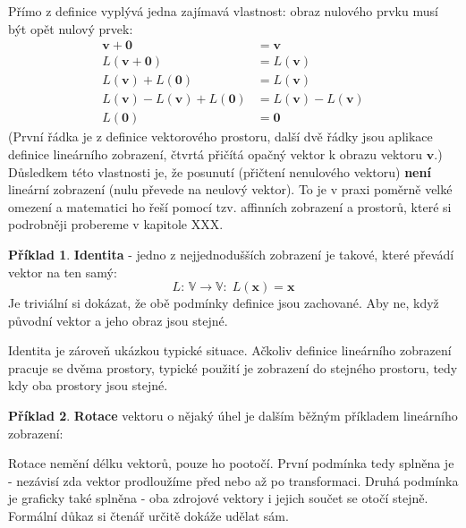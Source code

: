 \documentclass[a5paper,12pt]{amsbook}
\theoremstyle{definition}
\newtheorem{example}{Příklad}[chapter]
\newcommand{\myvec}[1]{\mathbf{#1}}
\newcommand{\myspace}[1]{\mathbb{#1}}
\newcommand{\mymap}[1]{#1}
\begin{document}
\noindent Přímo z definice vyplývá jedna zajímavá vlastnost: obraz nulového prvku musí být opět
nulový prvek:
\begin{align*}
\myvec{v} + \myvec{0} &= \myvec{v} \\
\mymap{L}(\myvec{v} + \myvec{0}) &= \mymap{L}(\myvec{v}) \\
\mymap{L}(\myvec{v}) + \mymap{L}(\myvec{0}) &= \mymap{L}(\myvec{v}) \\
\mymap{L}(\myvec{v}) - \mymap{L}(\myvec{v}) + \mymap{L}(\myvec{0}) 
    &= \mymap{L}(\myvec{v}) - \mymap{L}(\myvec{v}) \\
\mymap{L}(\myvec{0}) &= \myvec{0}
\end{align*}
(První řádka je z definice vektorového prostoru, další dvě řádky jsou aplikace definice
lineárního zobrazení, čtvrtá přičítá opačný vektor k obrazu vektoru $\myvec{v}$.) Důsledkem
této vlastnosti je, že posunutí (přičtení nenulového vektoru) \textbf{není} lineární zobrazení
(nulu převede na neulový vektor). To je v praxi poměrně velké omezení a matematici ho řeší
pomocí tzv. affinních zobrazení a prostorů, které si podrobněji probereme v kapitole XXX.

\begin{example}\textbf{Identita} - jedno z nejjednodušších zobrazení je takové, které převádí vektor
na ten samý:
\begin{equation*}
\mymap{L}:\,\myspace{V}\rightarrow\myspace{V}:\;\mymap{L}(\myvec{x})=\myvec{x}
\end{equation*} 
Je triviální si dokázat, že obě podmínky definice jsou zachované. Aby ne, když původní vektor
a jeho obraz jsou stejné.

Identita je zároveň ukázkou typické situace. Ačkoliv definice lineárního zobrazení pracuje se dvěma
prostory, typické použití je zobrazení do stejného prostoru, tedy kdy oba prostory jsou stejné.

\end{example}

\begin{example}\label{example:rotate}\textbf{Rotace} vektoru o nějaký úhel je dalším běžným příkladem
lineárního zobrazení:
\begin{center}

\end{center}
Rotace nemění délku vektorů, pouze ho pootočí. První podmínka tedy splněna je - nezávisí zda
vektor prodloužíme před nebo až po transformaci. Druhá podmínka je graficky také splněna - oba zdrojové
vektory i jejich součet se otočí stejně. Formální důkaz si čtenář určitě dokáže udělat sám.

\end{example}
\end{document}
